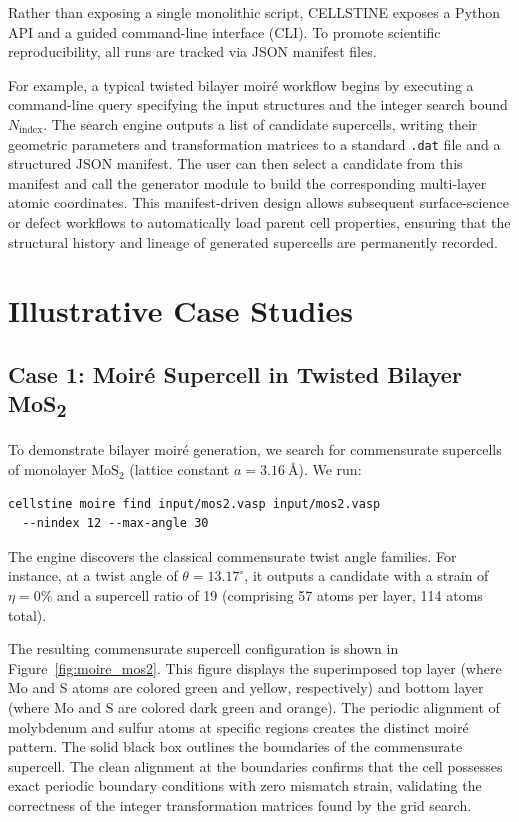 \documentclass[9pt,a4paper,twoside]{tau-class/tau}
\begin{document}
Rather than exposing a single monolithic script, CELLSTINE exposes a Python API and a guided command-line interface (CLI). To promote scientific reproducibility, all runs are tracked via JSON manifest files. 

For example, a typical twisted bilayer moir\'e workflow begins by executing a command-line query specifying the input structures and the integer search bound $N_{\text{index}}$. The search engine outputs a list of candidate supercells, writing their geometric parameters and transformation matrices to a standard \texttt{.dat} file and a structured JSON manifest. The user can then select a candidate from this manifest and call the generator module to build the corresponding multi-layer atomic coordinates. This manifest-driven design allows subsequent surface-science or defect workflows to automatically load parent cell properties, ensuring that the structural history and lineage of generated supercells are permanently recorded.

\section{Illustrative Case Studies}
\label{sec:applications}

\subsection{Case 1: Moir\'e Supercell in Twisted Bilayer MoS\textsubscript{2}}
To demonstrate bilayer moir\'e generation, we search for commensurate supercells of monolayer $\text{MoS}_2$ (lattice constant $a = \SI{3.16}{\angstrom}$). We run:
\begin{verbatim}
cellstine moire find input/mos2.vasp input/mos2.vasp 
  --nindex 12 --max-angle 30
\end{verbatim}
The engine discovers the classical commensurate twist angle families. For instance, at a twist angle of $\theta = 13.17^\circ$, it outputs a candidate with a strain of $\eta = 0\%$ and a supercell ratio of 19 (comprising 57 atoms per layer, 114 atoms total). 

The resulting commensurate supercell configuration is shown in Figure~\ref{fig:moire_mos2}. This figure displays the superimposed top layer (where Mo and S atoms are colored green and yellow, respectively) and bottom layer (where Mo and S are colored dark green and orange). The periodic alignment of molybdenum and sulfur atoms at specific regions creates the distinct moir\'e pattern. The solid black box outlines the boundaries of the commensurate supercell. The clean alignment at the boundaries confirms that the cell possesses exact periodic boundary conditions with zero mismatch strain, validating the correctness of the integer transformation matrices found by the grid search.
\end{document}
